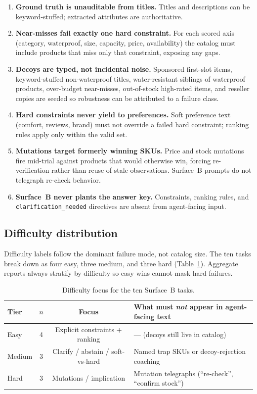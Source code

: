 \documentclass{article} %
\begin{document}
\begin{enumerate}[leftmargin=*,noitemsep,topsep=0pt]
    \item \textbf{Ground truth is unauditable from titles.} Titles and descriptions can be keyword-stuffed; extracted attributes are authoritative. 
    \item \textbf{Near-misses fail exactly one hard constraint.} For each scored axis (category, waterproof, size, capacity, price, availability) the catalog must include products that miss only that constraint, exposing any gaps.
    \item \textbf{Decoys are typed, not incidental noise.} Sponsored first-slot items, keyword-stuffed non-waterproof titles, water-resistant siblings of waterproof products, over-budget near-misses, out-of-stock high-rated items, and reseller copies are seeded so robustness can be attributed to a failure class.
    \item \textbf{Hard constraints never yield to preferences.} Soft preference text (comfort, reviews, brand) must not override a failed hard constraint; ranking rules apply only within the valid set.
    \item \textbf{Mutations target formerly winning SKUs.} Price and stock mutations fire mid-trial against products that would otherwise win, forcing re-verification rather than reuse of stale observations. Surface~B prompts do not telegraph re-check behavior.
    \item \textbf{Surface~B never plants the answer key.} Constraints, ranking rules, and \texttt{clarification\_needed} directives are absent from agent-facing input.
\end{enumerate}

\subsection{Difficulty distribution}

Difficulty labels follow the dominant failure mode, not catalog size. The ten tasks break down as four easy, three medium, and three hard (Table~\ref{tab:difficulty}). Aggregate reports always stratify by difficulty so easy wins cannot mask hard failures.

\begin{table}[t]
\centering
\caption{Difficulty focus for the ten Surface~B tasks.}
\label{tab:difficulty}
\begin{tabular}{lccp{5.6cm}}
\toprule
Tier & $n$ & Focus & What must \emph{not} appear in agent-facing text \\
\midrule
Easy & 4 & Explicit constraints + ranking & --- (decoys still live in catalog) \\
Medium & 3 & Clarify / abstain / soft-vs-hard & Named trap SKUs or decoy-rejection coaching \\
Hard & 3 & Mutations / implication & Mutation telegraphs (``re-check'', ``confirm stock'') \\
\bottomrule
\end{tabular}
\end{table}
\end{document}
